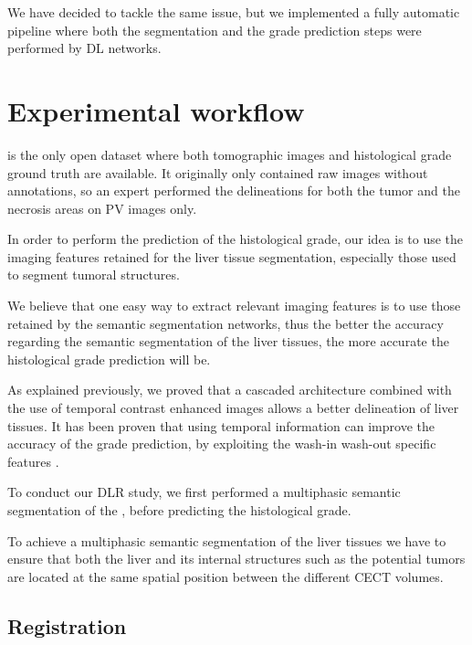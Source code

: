 We have decided to tackle the same issue, but we implemented a fully
automatic pipeline where both the segmentation and the grade prediction
steps were performed by DL networks.

\section{Experimental workflow}\label{experimental-workflow}

 is the only open dataset where both tomographic images and
histological grade ground truth are available. It originally only
contained raw images without annotations, so an expert performed the
delineations for both the tumor and the necrosis areas on PV images only.

In order to perform the prediction of the histological grade, our idea
is to use the imaging features retained for the liver tissue
segmentation, especially those used to segment tumoral structures.

We believe that one easy way to extract relevant imaging features is to
use those retained by the semantic segmentation networks, thus the
better the accuracy regarding the semantic segmentation of the liver
tissues, the more accurate the histological grade prediction will be.

As explained previously, we proved that a cascaded architecture combined
with the use of temporal contrast enhanced images allows a better
delineation of liver tissues. It has been proven that using temporal information can improve the accuracy of the grade prediction, by exploiting the wash-in
wash-out specific features \cite{Okamoto2012}.

To conduct our DLR study, we first performed a multiphasic
semantic segmentation of the , before predicting the
histological grade.

To achieve a multiphasic semantic segmentation of the liver tissues we
have to ensure that both the liver and its internal structures such as
the potential tumors are located at the same spatial position between
the different CECT volumes.


\subsection{Registration}\label{registration}

